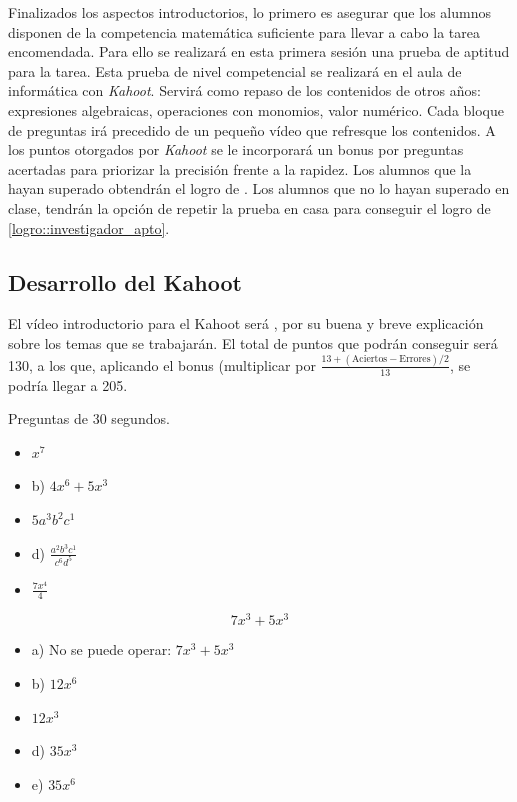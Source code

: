 Finalizados los aspectos introductorios, lo primero es asegurar que los alumnos disponen de la competencia matemática suficiente para llevar a cabo la tarea encomendada.
%
Para ello se realizará en esta primera sesión una prueba de aptitud para la tarea.
%
Esta prueba de nivel competencial se realizará en el aula de informática con \textit{Kahoot}.
%
Servirá como repaso de los contenidos de otros años: expresiones algebraicas, operaciones con monomios, valor numérico.
%
Cada bloque de preguntas irá precedido de un pequeño vídeo que refresque los contenidos.
%
A los puntos otorgados por \textit{Kahoot} se le incorporará un bonus por preguntas acertadas para priorizar la precisión frente a la rapidez.
%
Los alumnos que la hayan superado obtendrán el logro de .
%
Los alumnos que no lo hayan superado en clase, tendrán la opción de repetir la prueba en casa para conseguir el logro de \ref{logro::investigador_apto}.


\subsection{Desarrollo del Kahoot}

El vídeo introductorio para el Kahoot será \cite{VideoKahootSes1}, por su buena y breve explicación sobre los temas que se trabajarán.
%
El total de puntos que podrán conseguir será 130, a los que, aplicando el bonus (multiplicar por $\frac{13+(\text{Aciertos} - \text{Errores})/2}{13}$, se podría llegar a 205.

\newbloq Preguntas de 30 segundos.



\begin{itemize}
\item {} $x^7$
\item b) $4x^6+5x^3$
\item {} $5a^3b^2c^1$
\item d) $\frac{a^2b^3c^1}{c^6d^5}$
\item {} $\frac{7x^4}{4}$
\end{itemize}


\[
	7x^3+5x^3
\]

\begin{itemize}
	\item a) No se puede operar: $7x^3+5x^3$
	\item b) $12x^6$
	\item {} $12x^3$
	\item d) $35x^3$
	\item e) $35x^6$
\end{itemize}

